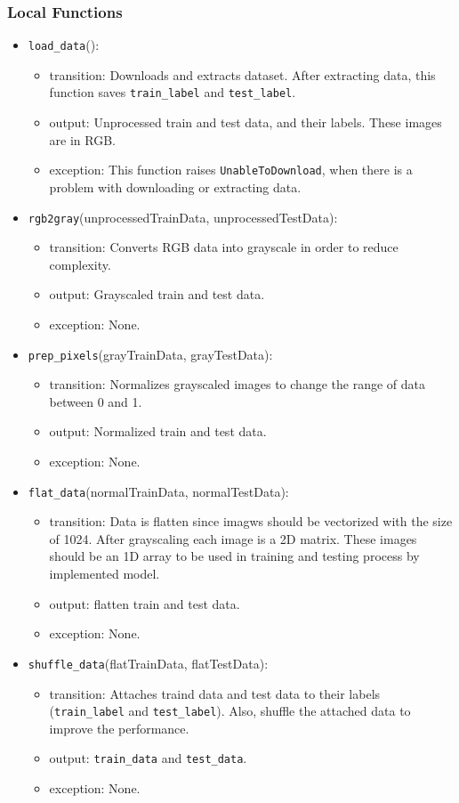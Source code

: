 \documentclass[12pt, titlepage]{article}
\def\code#1{\texttt{#1}}
\begin{document}
\subsubsection{Local Functions}
\begin{itemize}
  \item \code{load\_data}():
  \begin{itemize}
    \item transition: Downloads and extracts dataset. After extracting data, 
    this function saves \code{train\_label} and \code{test\_label}.
    \item output: Unprocessed train and test data, and their labels. 
    These images are in RGB. 
    \item exception: This function raises \code{UnableToDownload}, when there is 
    a problem with downloading or extracting data.
  \end{itemize}
  \item \code{rgb2gray}(unprocessedTrainData, unprocessedTestData):
  \begin{itemize}
    \item transition: Converts RGB data into grayscale in order to reduce complexity. 
    \item output: Grayscaled train and test data.
    \item exception: None.
  \end{itemize}
  \item \code{prep\_pixels}(grayTrainData, grayTestData):
  \begin{itemize}
    \item transition: Normalizes grayscaled images to change the range of data between 0 and 1.
    \item output: Normalized train and test data.
    \item exception: None.
  \end{itemize}
  \item \code{flat\_data}(normalTrainData, normalTestData):
  \begin{itemize}
    \item transition: Data is flatten since imagws should be vectorized with the size of 1024. 
    After grayscaling each image is a 2D matrix. These images should be an 1D array to be used in 
    training and testing process by implemented model.
    \item output: flatten train and test data.
    \item exception: None.
  \end{itemize}
  \item \code{shuffle\_data}(flatTrainData, flatTestData):
  \begin{itemize}
    \item transition: Attaches traind data and test data to their labels 
    (\code{train\_label} and \code{test\_label}). Also, shuffle the attached data to improve the 
    performance.
    \item output: \code{train\_data} and \code{test\_data}.
    \item exception: None.
  \end{itemize}

\end{itemize}
\end{document}
